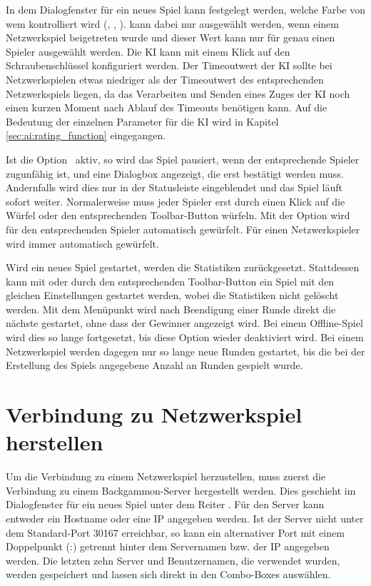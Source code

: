 In dem Dialogfenster für ein neues Spiel kann festgelegt werden, welche Farbe von wem kontrolliert wird (, , ).  kann dabei nur ausgewählt werden, wenn einem Netzwerkspiel beigetreten wurde und dieser Wert kann nur für genau einen Spieler ausgewählt werden. Die KI kann mit einem Klick auf den Schraubenschlüssel konfiguriert werden. Der Timeoutwert der KI sollte bei Netzwerkspielen etwas niedriger als der Timeoutwert des entsprechenden Netzwerkspiels liegen, da das Verarbeiten und Senden eines Zuges der KI noch einen kurzen Moment nach Ablauf des Timeouts benötigen kann. Auf die Bedeutung der einzelnen Parameter für die KI wird in Kapitel \ref{sec:ai:rating_function} eingegangen.

Ist die Option \ aktiv, so wird das Spiel pausiert, wenn der entsprechende Spieler zugunfähig ist, und eine Dialogbox angezeigt, die erst bestätigt werden muss. Andernfalls wird dies nur in der Statusleiste eingeblendet und das Spiel läuft sofort weiter. Normalerweise muss jeder Spieler erst durch einen Klick auf die Würfel oder den entsprechenden Toolbar-Button würfeln. Mit der Option  wird für den entsprechenden Spieler automatisch gewürfelt. Für einen Netzwerkspieler wird immer automatisch gewürfelt.

Wird ein neues Spiel gestartet, werden die Statistiken zurückgesetzt. Stattdessen kann mit  oder durch den entsprechenden Toolbar-Button ein Spiel mit den gleichen Einstellungen gestartet werden, wobei die Statistiken nicht gelöscht werden. Mit dem Menüpunkt  wird nach Beendigung einer Runde direkt die nächste gestartet, ohne dass der Gewinner angezeigt wird. Bei einem Offline-Spiel wird dies so lange fortgesetzt, bis diese Option wieder deaktiviert wird. Bei einem Netzwerkspiel werden dagegen nur so lange neue Runden gestartet, bis die bei der Erstellung des Spiels angegebene Anzahl an Runden gespielt wurde.

\section{Verbindung zu Netzwerkspiel herstellen}
Um die Verbindung zu einem Netzwerkspiel herzustellen, muss zuerst die Verbindung zu einem Backgammon-Server hergestellt werden. Dies geschieht im Dialogfenster für ein neues Spiel unter dem Reiter . Für den Server kann entweder ein Hostname oder eine IP angegeben werden. Ist der Server nicht unter dem Standard-Port 30167 erreichbar, so kann ein alternativer Port mit einem Doppelpunkt (:) getrennt hinter dem Servernamen bzw. der IP angegeben werden. Die letzten zehn Server und Benutzernamen, die verwendet wurden, werden gespeichert und lassen sich direkt in den Combo-Boxes auswählen.

